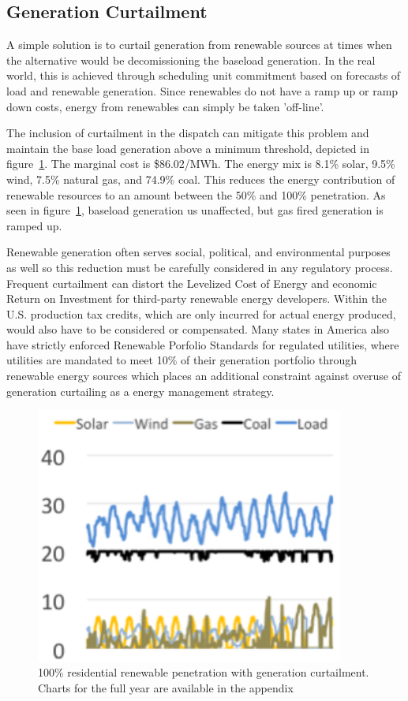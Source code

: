 \documentclass[a4paper]{article}
\begin{document}
\subsection{Generation Curtailment}
A simple solution is to curtail generation from renewable sources at times when the alternative would be decomissioning the baseload generation. In the real world, this is achieved through scheduling unit commitment based on forecasts of load and renewable generation. Since renewables do not have a ramp up or ramp down costs, energy from renewables can simply be taken 'off-line'. 

The inclusion of curtailment in the dispatch can mitigate this problem and maintain the base load generation above a minimum threshold, depicted in figure~\ref{fig:FIG7}. The marginal cost is \$86.02/MWh. The energy mix is 8.1\% solar, 9.5\% wind, 7.5\% natural gas, and 74.9\% coal. This reduces the energy contribution of renewable resources to an amount between the 50\% and 100\% penetration. As seen in figure~\ref{fig:FIG7}, baseload generation us unaffected, but gas fired generation is ramped up. 

Renewable generation often serves social, political, and environmental purposes as well so this reduction must be carefully considered in any regulatory process. Frequent curtailment can distort the Levelized Cost of Energy and economic Return on Investment for third-party renewable energy developers. Within the U.S. production tax credits, which are only incurred for actual energy produced, would also have to be considered or compensated. Many states in America also have strictly enforced Renewable Porfolio Standards for regulated utilities, where utilities are mandated to meet 10\% of their generation portfolio through renewable energy sources which places an additional constraint against overuse of generation curtailing as a energy management strategy. 

\begin{figure}
\centering
\includegraphics[width=0.9\textwidth , height=0.25\textheight]{FIG7.png}
\caption{\label{fig:FIG7}100\% residential renewable penetration with generation curtailment. Charts for the full year are available in the appendix}
\end{figure}
\end{document}
